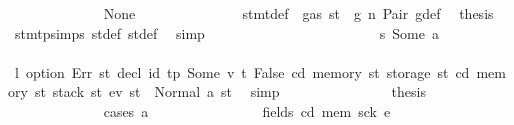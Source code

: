 \begin{isabellebody}
\ \ \ \ \ \ \ \ \ \ \ \ \isamarkupfalse%
\ None\isanewline
\ \ \ \ \ \ \ \ \ \ \ \ \isamarkupfalse%
\ {}{}{\isacharparenleft}{\kern0pt}{}{\isacharparenright}{\kern0pt}\ stmt{\isacharunderscore}{\kern0pt}def\ {\isacharbackquoteopen}{\isasymnot}\ gas\ st\ {\isasymle}\ g{\isacharbackquoteclose}\ n\ Pair\ g{\isacharunderscore}{\kern0pt}def\ \isamarkupfalse%
\ {\isacharquery}{\kern0pt}thesis\ \isamarkupfalse%
\ stmt{\isachardot}{\kern0pt}psimps{\isacharparenleft}{\kern0pt}{}{}{\isacharparenright}{\kern0pt}\ st{\isacharprime}{\kern0pt}{\isacharunderscore}{\kern0pt}def\ st{\isacharprime}{\kern0pt}{\isacharprime}{\kern0pt}{\isacharunderscore}{\kern0pt}def\ \isamarkupfalse%
\ simp\isanewline
\ \ \ \ \ \ \ \ \ \ \isamarkupfalse%
\isanewline
\ \ \ \ \ \ \ \ \ \ \ \ \isamarkupfalse%
\ s{}{\isacharcolon}{\kern0pt}\ {\isacharparenleft}{\kern0pt}Some\ a{\isacharparenright}{\kern0pt}\isanewline
\ \ \ \ \ \ \ \ \ \ \ \ \isamarkupfalse%
\ \isamarkupfalse%
\ l{}{\isacharcolon}{\kern0pt}\ {\isachardoublequoteopen}option\ Err\ {\isacharparenleft}{\kern0pt}{\isasymlambda}st{\isachardot}{\kern0pt}\ decl\ id{}\ tp\ {\isacharparenleft}{\kern0pt}Some\ {\isacharparenleft}{\kern0pt}v{\isacharcomma}{\kern0pt}\ t{\isacharparenright}{\kern0pt}{\isacharparenright}{\kern0pt}\ False\ cd\ {\isacharparenleft}{\kern0pt}memory\ st{\isacharparenright}{\kern0pt}\ {\isacharparenleft}{\kern0pt}storage\ st{\isacharparenright}{\kern0pt}\ {\isacharparenleft}{\kern0pt}cd{\isacharcomma}{\kern0pt}\ memory\ st{\isacharcomma}{\kern0pt}\ stack\ st{\isacharcomma}{\kern0pt}\ e\isactrlsub v{\isacharparenright}{\kern0pt}{\isacharparenright}{\kern0pt}\ st{\isacharprime}{\kern0pt}{\isacharprime}{\kern0pt}\ {\isacharequal}{\kern0pt}\ Normal\ {\isacharparenleft}{\kern0pt}a{\isacharcomma}{\kern0pt}\ st{\isacharprime}{\kern0pt}{\isacharprime}{\kern0pt}{\isacharparenright}{\kern0pt}{\isachardoublequoteclose}\ \isamarkupfalse%
\ simp\isanewline
\ \ \ \ \ \ \ \ \ \ \ \ \isamarkupfalse%
\ \isamarkupfalse%
\ {\isacharquery}{\kern0pt}thesis\isanewline
\ \ \ \ \ \ \ \ \ \ \ \ \isamarkupfalse%
\ {\isacharparenleft}{\kern0pt}cases\ a{\isacharparenright}{\kern0pt}\isanewline
\ \ \ \ \ \ \ \ \ \ \ \ \ \ \isamarkupfalse%
\ {\isacharparenleft}{\kern0pt}fields\ cd{\isacharprime}{\kern0pt}\ mem{\isacharprime}{\kern0pt}\ sck{\isacharprime}{\kern0pt}\ e{\isacharprime}{\kern0pt}{\isacharparenright}{\kern0pt}\isanewline

\end{isabellebody}
